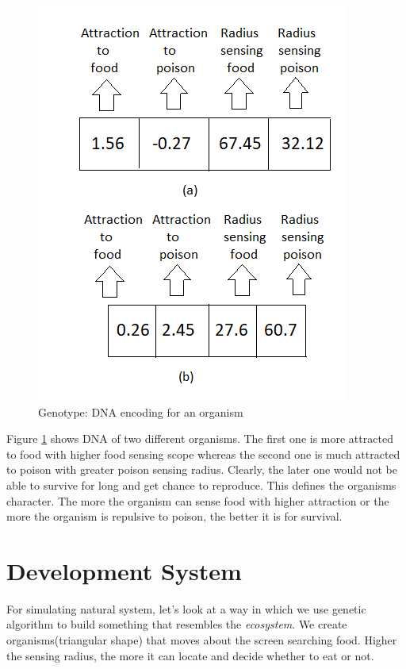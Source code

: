 \documentclass[conference]{IEEEtran}
\begin{document}
\begin{figure}
	\includegraphics[scale=1]{genotype.png}
	\caption{Genotype: DNA encoding for an organism}
	\label{fig:genotype}
\end{figure}
Figure \ref{fig:genotype} shows DNA of two different organisms. The first one is more attracted to food with higher food sensing scope whereas the second one is much attracted to poison with greater poison sensing radius. Clearly, the later one would not be able to survive for long and get chance to reproduce. This defines the organisms character. The more the organism can sense food with higher attraction or the more the organism is repulsive to poison, the better it is for survival.

\section{Development System}
For simulating natural system, let's look at a way in which we use genetic algorithm to build something that resembles the \textit{ecosystem}. We create organisms(triangular shape) that moves about the screen searching food. Higher the sensing radius, the more it can locate and decide whether to eat or not.
\end{document}
